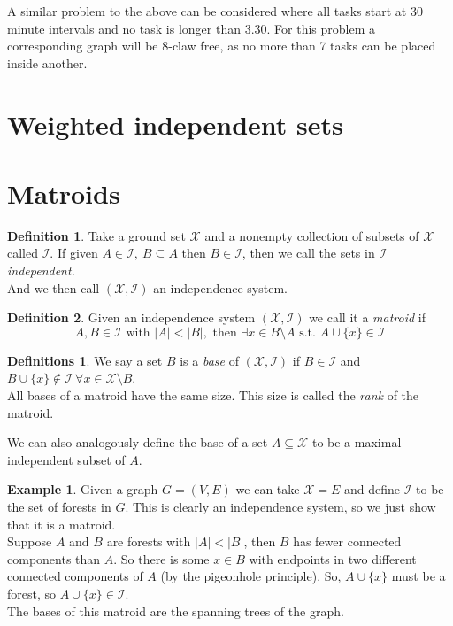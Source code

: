 \documentclass{article}
\theoremstyle{definition}
\newtheorem*{defn}{Definition}
\newtheorem*{defns}{Definitions}
\newtheorem*{ex}{Example}
\newcommand{\X}{\mathcal{X}}
\newcommand{\I}{\mathcal{I}}
\begin{document}
A similar problem to the above can be considered where all tasks start at 30 minute intervals and no task is longer than 3.30.
For this problem a corresponding graph will be 8-claw free, as no more than 7 tasks can be placed inside another.

\section{Weighted independent sets}



\section{Matroids}

\begin{defn}
Take a ground set $\X$ and a nonempty collection of subsets of $\X$ called $\I$.
If given $A\in \I,\ B\subseteq A$ then $B\in \I$, then we call the sets in $\I$ \emph{independent}.\\
And we then call $(\X,\I)$ an independence system.
\end{defn}

\begin{defn}
Given an independence system $(\X,\I)$ we call it a \emph{matroid} if 
$$A,B\in \I \text{ with } |A|<|B|, \text{ then } \exists x\in B\setminus A \text{ s.t. } A\cup \{x\} \in \I$$
\end{defn}

\begin{defns}
We say a set $B$ is a \emph{base} of $(\X,\I)$ if $B\in \I$ and $B\cup \{x\}\not\in\I\ \forall x\in\X\setminus B$.\\
All bases of a matroid have the same size.
This size is called the \emph{rank} of the matroid.
\end{defns}

We can also analogously define the base of a set $A\subseteq \X$ to be a maximal independent subset of $A$.

\begin{ex}
Given a graph $G = (V,E)$ we can take $\X = E$ and define $\I$ to be the set of forests in $G$.
This is clearly an independence system, so we just show that it is a matroid. \\
Suppose $A$ and $B$ are forests with $|A|<|B|$, then $B$ has fewer connected components than $A$.
So there is some $x\in B$ with endpoints in two different connected components of $A$ (by the pigeonhole principle).
So, $A\cup\{x\}$ must be a forest, so $A\cup\{x\} \in \I$. \\
The bases of this matroid are the spanning trees of the graph.
\end{ex}
\end{document}
